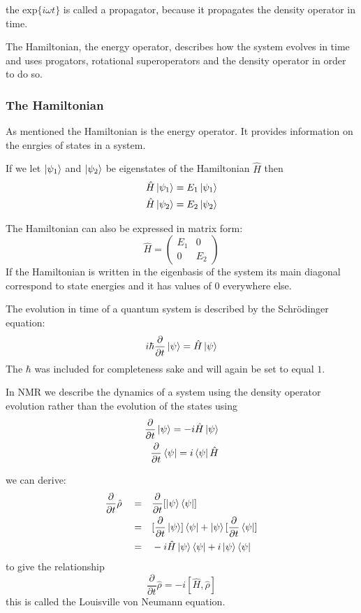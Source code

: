 the $\text{exp}\{i\omega t\}$ is called a propagator, because it propagates the density operator in time.

The Hamiltonian, the energy operator, describes how the system evolves in time and uses progators, rotational superoperators and the density operator in order to do so.

\subsubsection{The Hamiltonian}\label{Hamiltonian}

As mentioned the Hamiltonian is the energy operator. It provides information on the enrgies of states in a system.

If we let $\ket{\psi_1}$ and $\ket{\psi_2}$ be eigenstates of the Hamiltonian $\hat{H}$ then
\begin{align}
  \hat{H}\ket{\psi_1} = E_1\ket{\psi_1}\\
  \hat{H}\ket{\psi_2} = E_2\ket{\psi_2}
\end{align}

The Hamiltonian can also be expressed in matrix form:
\begin{equation}
  \hat{H} = \begin{pmatrix}
    E_1 & 0\\
    0 & E_2
\end{pmatrix}
\end{equation}
If the Hamiltonian is written in the eigenbasis of the system its main diagonal correspond to state energies and it has values of $0$ everywhere else.

The evolution in time of a quantum system is described by the Schr\"odinger equation:
\begin{equation}
  i\hbar\frac{\partial}{\partial{t}}\ket{\psi} = \hat{H}\ket{\psi}
\end{equation}
The $\hbar$ was included for completeness sake and will again be set to equal $1$.

In NMR we describe the dynamics of a system using the density operator evolution rather than the evolution of the states using
\begin{align}
  \frac{\partial}{\partial{t}}\ket{\psi} = -i\hat{H}\ket{\psi}\\
  \frac{\partial}{\partial{t}}\bra{\psi} = i\bra{\psi}\hat{H}
\end{align}

we can derive\citep{Neumann2018}:
\begin{align}
  \frac{\partial}{\partial{t}}\hat\rho\quad=&\quad \frac{\partial}{\partial{t}}[\ket{\psi}\bra{\psi}]\\
  =&\quad[\frac{\partial}{\partial{t}}\ket{\psi}]\bra{\psi} + \ket{\psi}[\frac{\partial}{\partial{t}}\bra{\psi}]\\
  =&\quad-i\hat{H}\ket{\psi}\bra{\psi} + i\ket{\psi}\bra{\psi}
\end{align}
to give the relationship
\begin{equation}
  \frac{\partial}{\partial{t}}\hat\rho = -i[\hat{H},\hat\rho]
\end{equation}
this is called the Louisville von Neumann equation.


